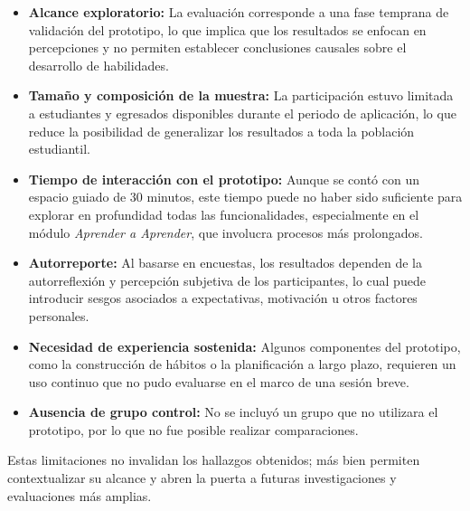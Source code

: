 \begin{itemize}
    \item \textbf{Alcance exploratorio:} La evaluación corresponde a una fase temprana de validación del prototipo, lo que implica que los resultados se enfocan en percepciones y no permiten establecer conclusiones causales sobre el desarrollo de habilidades.

    \item \textbf{Tamaño y composición de la muestra:} La participación estuvo limitada a estudiantes y egresados disponibles durante el periodo de aplicación, lo que reduce la posibilidad de generalizar los resultados a toda la población estudiantil.

    \item \textbf{Tiempo de interacción con el prototipo:} Aunque se contó con un espacio guiado de 30 minutos, este tiempo puede no haber sido suficiente para explorar en profundidad todas las funcionalidades, especialmente en el módulo \textit{Aprender a Aprender}, que involucra procesos más prolongados.

    \item \textbf{Autorreporte:} Al basarse en encuestas, los resultados dependen de la autorreflexión y percepción subjetiva de los participantes, lo cual puede introducir sesgos asociados a expectativas, motivación u otros factores personales.

    \item \textbf{Necesidad de experiencia sostenida:} Algunos componentes del prototipo, como la construcción de hábitos o la planificación a largo plazo, requieren un uso continuo que no pudo evaluarse en el marco de una sesión breve.

    \item \textbf{Ausencia de grupo control:} No se incluyó un grupo que no utilizara el prototipo, por lo que no fue posible realizar comparaciones.
\end{itemize}

Estas limitaciones no invalidan los hallazgos obtenidos; más bien permiten contextualizar su alcance y abren la puerta a futuras investigaciones y evaluaciones más amplias.






